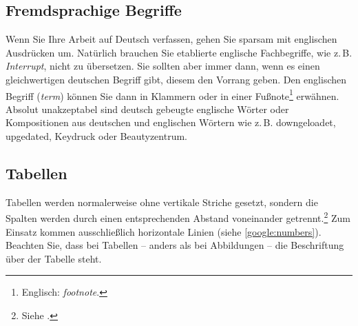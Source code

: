 \documentclass[conference,compsoc,final,a4paper]{IEEEtran}
\begin{document}
    \subsection{Fremdsprachige Begriffe}
    Wenn Sie Ihre Arbeit auf Deutsch verfassen, gehen Sie sparsam mit englischen Ausdrücken um. Natürlich brauchen Sie etablierte englische Fachbegriffe, wie z.\,B. \textit{Interrupt}, nicht zu übersetzen. Sie sollten aber immer dann, wenn es einen gleichwertigen deutschen Begriff gibt, diesem den Vorrang geben. Den englischen Begriff (\textit{term}) können Sie dann in Klammern oder in einer Fußnote\footnote{Englisch: \textit{footnote}.} erwähnen. Absolut unakzeptabel sind deutsch gebeugte englische Wörter oder Kompositionen aus deutschen und englischen Wörtern wie z.\,B. downgeloadet, upgedated, Keydruck oder Beautyzentrum.

    \subsection{Tabellen}
    Tabellen werden normalerweise ohne vertikale Striche gesetzt, sondern die Spalten werden durch einen entsprechenden Abstand voneinander getrennt.\footnote{Siehe \cite[S. 89]{Willberg1999}.} Zum Einsatz kommen ausschließlich horizontale Linien (siehe \autoref{google:numbers}). Beachten Sie, dass bei Tabellen -- anders als bei Abbildungen -- die Beschriftung über der Tabelle steht.
\end{document}
